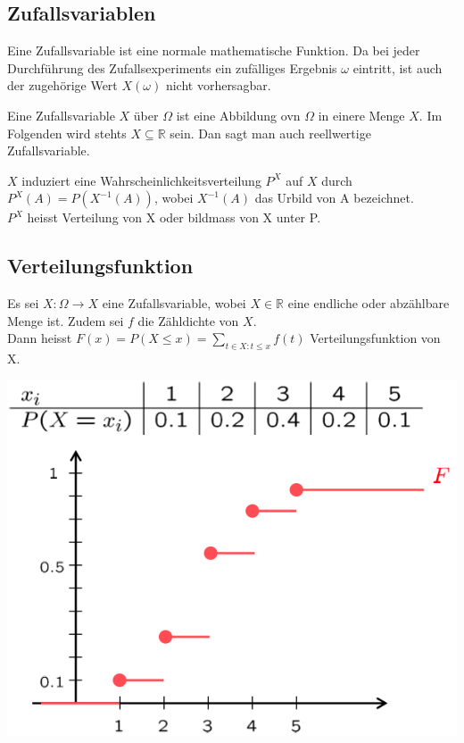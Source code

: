 \documentclass[10pt]{article}
\newtheorem[M]{definition}{Def.}
\newtheorem[M]{satz}{Satz}
\numberwithin{equation}{section}
\newcommand{\RN}{\mathbb{R}} %
\begin{document}
\subsection{Zufallsvariablen}
Eine Zufallsvariable ist eine normale mathematische Funktion. Da bei jeder Durchführung des Zufallsexperiments ein zufälliges Ergebnis $\omega$ eintritt, ist auch der zugehörige Wert $X(\omega)$ nicht vorhersagbar.
\begin{definition}[Zufallsvariable]
Eine Zufallsvariable $X$ über $\Omega$ ist eine Abbildung ovn $\Omega$ in einere Menge $X$. Im Folgenden wird stehts $X \subseteq \RN$ sein. Dan sagt man auch reellwertige Zufallsvariable.
\end{definition}
$X$ induziert eine Wahrscheinlichkeitsverteilung $P^X$ auf $X$ durch $P^X(A)=P(X^{-1}(A))$, wobei $X^{-1}(A)$ das Urbild von A bezeichnet. \\
$P^X$ heisst Verteilung von X oder bildmass von X unter P.

\subsection{Verteilungsfunktion}
\begin{definition}[Verteilungsfunktion]
Es sei $X : \Omega \rightarrow X$ eine Zufallsvariable, wobei $X \in \RN$ eine endliche oder abzählbare Menge ist. Zudem sei $f$ die Zähldichte von $X$. \\
Dann heisst $F(x)=P(X \leq x) = \sum_{t \in X:t \leq x} f(t)$ Verteilungsfunktion von X.
\end{definition}
\begin{center}
	\includegraphics[scale=0.3]{verteilungsfunktion.png}
\end{center}
\end{document}
